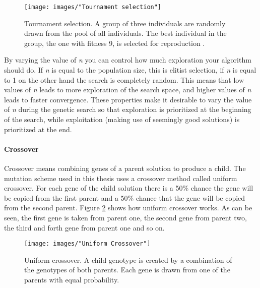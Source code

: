 \begin{figure}[h!]
\begin{center}
\texttt{[image: images/"Tournament selection"]}
\caption{Tournament selection. A group of three individuals are randomly drawn from the pool of all individuals. The best individual  in the group, the one with fitness 9, is selected for reproduction \citep{Razali}.}
\label{Tournament selection}
\end{center}
\end{figure}


\noindent By varying the value of \textit{n} you can control how much exploration your algorithm should do. If \textit{n} is equal to the population size, this is elitist selection, if \textit{n} is equal to 1 on the other hand the search is completely random. This means that low values of \textit{n} leads to more exploration of the search space, and higher values of \textit{n} leads to faster convergence. These properties make it desirable to vary the value of \textit{n} during the genetic search so that exploration is prioritized at the beginning of the search, while exploitation (making use of seemingly good solutions) is prioritized at the end.\\


\paragraph*{Crossover}
Crossover means combining genes of a parent solution to produce a child. The mutation scheme used in this thesis uses a crossover method called uniform crossover. For each gene of the child solution there is a 50\% chance the gene will be copied from the first parent and a 50\% chance that the gene will be copied from the second parent. Figure \ref{Uniform Crossover} shows how uniform crossover works. As can be seen, the first gene is taken from parent one, the second gene from parent two, the third and forth gene from parent one and so on. 


\begin{figure}[h!]
\begin{center}
\texttt{[image: images/"Uniform Crossover"]}
\caption{Uniform crossover. A child genotype is created by a combination of the genotypes of both parents. Each gene is drawn from one of the parents with equal probability.}
\label{Uniform Crossover}
\end{center}
\end{figure}


